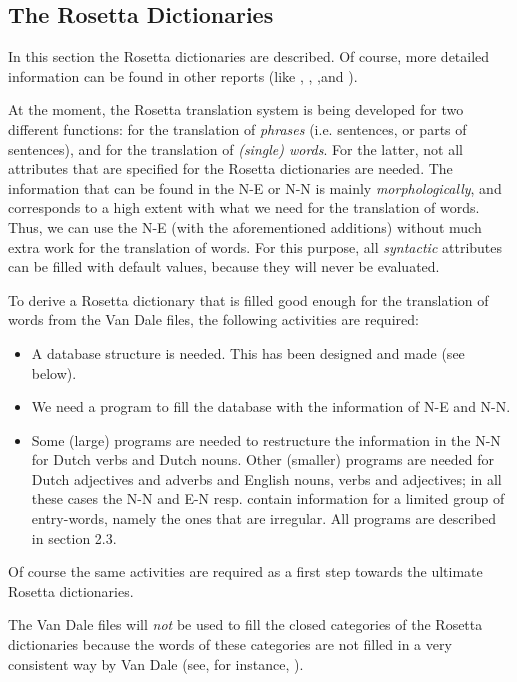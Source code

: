 \subsection{The Rosetta Dictionaries}
 
In this section the Rosetta dictionaries are described. Of 
course, more detailed information can be found in other reports 
(like \cite{la:r2},
\cite{fe:r2}, \cite{la:r3},and \cite{os:r3}). 
 
At the moment, the Rosetta translation system is being developed for two 
different functions: for the translation of {\em phrases}
(i.e. sentences, or parts of sentences), and for the translation of
{\em (single) words}. For the latter, not all attributes that are
specified for the Rosetta dictionaries are needed.
The information that can be found in the N-E or N-N is mainly 
{\em morphologically}, and 
corresponds to a high extent with what we need for the translation of words.
Thus, we can use the N-E (with the aforementioned additions) without much extra
work for the translation of words. For this purpose, all {\em syntactic} 
attributes can be filled with default values, because they will never be
evaluated.
 
To derive a Rosetta dictionary that is filled good enough for the translation 
of words from the Van Dale files, the following activities are required:
\begin{itemize}
  \item A database structure is needed. This has been designed and made 
        (see below). 
  \item We need a program to fill the database with the information of 
        N-E and N-N.
  \item Some (large) programs are needed to restructure the information
        in the N-N for Dutch verbs and Dutch nouns. 
        Other (smaller) programs 
        are needed for Dutch adjectives and adverbs and English nouns, 
        verbs and adjectives; in all these cases the N-N and E-N resp. contain
        information for a limited group of entry-words, namely the ones that 
        are irregular. All programs are described in section 2.3.
\end{itemize}
 
Of course the same activities are required as a first step towards the 
ultimate Rosetta dictionaries.
 
The Van Dale files will {\em not} be used to fill the closed categories of the
Rosetta dictionaries because the words of these categories are not filled in a 
very consistent way by Van Dale (see, for instance, \cite{od:cert}).
 
